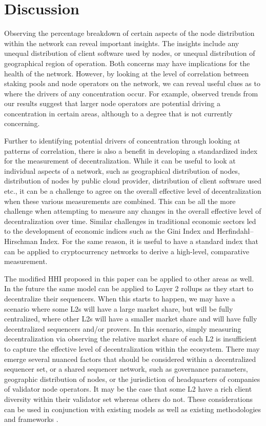 \documentclass[conference]{IEEEtran}
\begin{document}
\section{Discussion}
\label{sec:discussion}

Observing the percentage breakdown of certain aspects of the node distribution within the network can reveal important insights.  The insights include any unequal distribution of client software used by nodes, or unequal distribution of geographical region of operation.  Both concerns may have implications for the health of the network.  However, by looking at the level of correlation between staking pools and node operators on the network, we can reveal useful clues as to where the drivers of any concentration occur.  For example, observed trends from our results suggest that larger node operators are potential driving a concentration in certain areas, although to a degree that is not currently concerning.

Further to identifying potential drivers of concentration through looking at patterns of correlation, there is also a benefit in developing a standardized index for the measurement of decentralization.  While it can be useful to look at individual aspects of a network, such as geographical distribution of nodes, distribution of nodes by public cloud provider, distribution of client software used etc., it can be a challenge to agree on the overall effective level of decentralization when these various measurements are combined.  This can be all the more challenge when attempting to measure any changes in the overall effective level of decentralization over time.  Similar challenges in traditional economic sectors led to the development of economic indices such as the Gini Index and Herfindahl–Hirschman Index.  For the same reason, it is useful to have a standard index that can be applied to cryptocurrency networks to derive a high-level, comparative measurement.

The modified HHI proposed in this paper can be applied to other areas as well.  In the future the same model can be applied to Layer 2 rollups as they start to decentralize their sequencers.  When this starts to happen, we may have a scenario where some L2s will have a large market share, but will be fully centralized, where other L2s will have a smaller market share and will have fully decentralized sequencers and/or provers.  In this scenario, simply measuring decentralization via observing the relative market share of each L2 is insufficient to capture the effective level of decentralization within the ecosystem.  There may emerge several nuanced factors that should be considered within a decentralized sequencer set, or a shared sequencer network, such as governance parameters, geographic distribution of nodes, or the jurisdiction of headquarters of companies of validator node operators.  It may be the case that some L2 have a rich client diversity within their validator set whereas others do not.  These considerations can be used in conjunction with existing models as well as existing methodologies and frameworks \cite{l2beat2024}.
\end{document}
